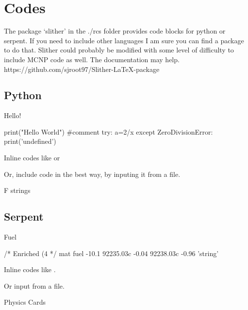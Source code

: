 \chapter{Codes}
\label{app:codes}
The package `slither' in the ./rcs folder provides code blocks for python or serpent. If you need to include other languages I am sure you can find a package to do that. Slither could probably be modified with some level of difficulty to include MCNP code as well. The documentation may help.
https://github.com/sjroot97/Slither-LaTeX-package

\section{Python}

\begin{code}\caption{Hello!} \begin{python}
    print("Hello World") #comment
    try:
        a=2/x
    except ZeroDivisionError:
        print('undefined')
\end{python}\label{code:hello}\end{code}

Inline codes like  or 

Or, include code in the best way, by inputing it from a file.
\begin{code}\caption{F strings}
\label{code:fstrings}\end{code}

\newpage
\section{Serpent}

\begin{code}\caption{Fuel} \begin{serpent}
    /*
    Enriched (4%
    */
    mat fuel     -10.1
    92235.03c    -0.04 
    92238.03c    -0.96
    'string'
\end{serpent}\label{code:fuel}\end{code}

Inline codes like .

Or input from a file.
\begin{code}\caption{Physics Cards}
    \label{code:physics}\end{code}

